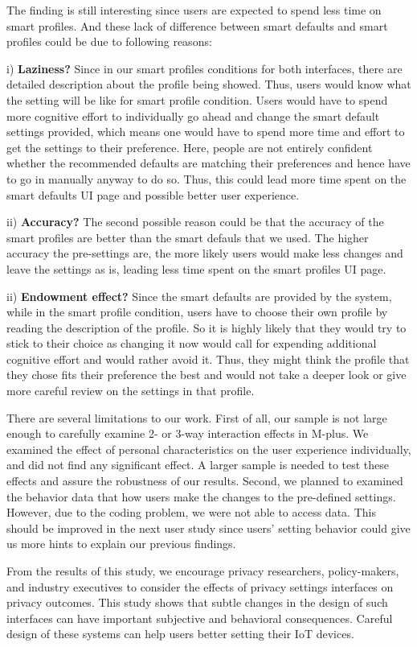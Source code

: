 The finding is still interesting since users are expected to spend less time on smart profiles. And these lack of difference between smart defaults and smart profiles could be due to following reasons:

i) \textbf{Laziness?} Since in our smart profiles conditions for both interfaces, there are detailed description about the profile being showed. Thus, users would know what the setting will be like for smart profile condition. Users would have to spend more cognitive effort to individually go ahead and change the smart default settings provided, which means one would have to spend more time and effort to get the settings to their preference. Here, people are not entirely confident whether the recommended defaults are matching their preferences and hence have to go in manually anyway to do so. Thus, this could lead more time spent on the smart defaults UI page and possible better user experience.

ii) \textbf{Accuracy?} The second possible reason could be that the accuracy of the smart profiles are better than the smart defauls that we used. The higher accuracy the pre-settings are, the more likely users would make less changes and leave the settings as is, leading less time spent on the smart profiles UI page.

ii) \textbf{Endowment effect?} Since the smart defaults are provided by the system, while in the smart profile condition, users have to choose their own profile by reading the description of the profile. So it is highly likely that they would try to stick to their choice as changing it now would call for expending additional cognitive effort and would rather avoid it. Thus, they might think the profile that they chose fits their preference the best and would not take a deeper look or give more careful review on the settings in that profile.

There are several limitations to our work. First of all, our sample is not large enough to carefully examine 2- or 3-way interaction effects in M-plus. We examined the effect of personal characteristics on the user experience individually, and did not find any significant effect. A larger sample is needed to test these effects and assure the robustness of our results. Second, we planned to examined the behavior data that how users make the changes to the pre-defined settings. However, due to the coding problem, we were not able to access data. This should be improved in the next user study since users' setting behavior could give us more hints to explain our previous findings.

From the results of this study, we encourage privacy researchers, policy-makers, and industry executives to consider the effects of privacy settings interfaces on privacy outcomes. This study shows that subtle changes in the design of such interfaces can have important subjective and behavioral consequences. Careful design of these systems can help users better setting their IoT devices.
